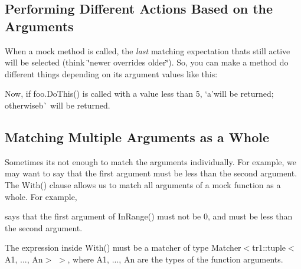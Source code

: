 \subsection*{Performing Different Actions Based on the Arguments}

When a mock method is called, the {\itshape last} matching expectation that\textquotesingle{}s still active will be selected (think \char`\"{}newer overrides older\char`\"{}). So, you can make a method do different things depending on its argument values like this\+:


\begin{DoxyCode}{0}
\DoxyCodeLine{}
\end{DoxyCode}


Now, if {\ttfamily foo.\+Do\+This()} is called with a value less than 5, `\textquotesingle{}a'{\ttfamily will be returned; otherwise}\textquotesingle{}b\textquotesingle{}\`{} will be returned.

\subsection*{Matching Multiple Arguments as a Whole}

Sometimes it\textquotesingle{}s not enough to match the arguments individually. For example, we may want to say that the first argument must be less than the second argument. The {\ttfamily With()} clause allows us to match all arguments of a mock function as a whole. For example,


\begin{DoxyCode}{0}
\end{DoxyCode}


says that the first argument of {\ttfamily In\+Range()} must not be 0, and must be less than the second argument.

The expression inside {\ttfamily With()} must be a matcher of type {\ttfamily Matcher$<$tr1\+::tuple$<$A1, ..., An$>$ $>$}, where {\ttfamily A1}, ..., {\ttfamily An} are the types of the function arguments.

